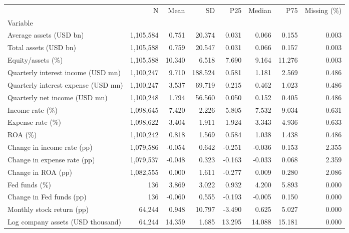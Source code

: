 \begin{tabular}{lrrrrrrr}
\toprule
 & N & Mean & SD & P25 & Median & P75 & Missing (\%) \\
Variable &  &  &  &  &  &  &  \\
\midrule
Average assets (USD bn) & 1,105,584 & 0.751 & 20.374 & 0.031 & 0.066 & 0.155 & 0.003 \\
Total assets (USD bn) & 1,105,588 & 0.759 & 20.547 & 0.031 & 0.066 & 0.157 & 0.003 \\
Equity/assets (\%) & 1,105,588 & 10.340 & 6.518 & 7.690 & 9.164 & 11.276 & 0.003 \\
Quarterly interest income (USD mn) & 1,100,247 & 9.710 & 188.524 & 0.581 & 1.181 & 2.569 & 0.486 \\
Quarterly interest expense (USD mn) & 1,100,247 & 3.537 & 69.719 & 0.215 & 0.462 & 1.023 & 0.486 \\
Quarterly net income (USD mn) & 1,100,248 & 1.794 & 56.560 & 0.050 & 0.152 & 0.405 & 0.486 \\
Income rate (\%) & 1,098,645 & 7.420 & 2.226 & 5.805 & 7.532 & 9.034 & 0.631 \\
Expense rate (\%) & 1,098,622 & 3.404 & 1.911 & 1.924 & 3.343 & 4.936 & 0.633 \\
ROA (\%) & 1,100,242 & 0.818 & 1.569 & 0.584 & 1.038 & 1.438 & 0.486 \\
Change in income rate (pp) & 1,079,586 & -0.054 & 0.642 & -0.251 & -0.036 & 0.153 & 2.355 \\
Change in expense rate (pp) & 1,079,537 & -0.048 & 0.323 & -0.163 & -0.033 & 0.068 & 2.359 \\
Change in ROA (pp) & 1,082,555 & 0.000 & 1.611 & -0.277 & 0.009 & 0.280 & 2.086 \\
Fed funds (\%) & 136 & 3.869 & 3.022 & 0.932 & 4.200 & 5.893 & 0.000 \\
Change in Fed funds (pp) & 136 & -0.060 & 0.555 & -0.193 & -0.005 & 0.150 & 0.000 \\
Monthly stock return (pp) & 64,244 & 0.948 & 10.797 & -3.490 & 0.625 & 5.027 & 0.000 \\
Log company assets (USD thousand) & 64,244 & 14.359 & 1.685 & 13.295 & 14.088 & 15.181 & 0.000 \\
\bottomrule
\end{tabular}
